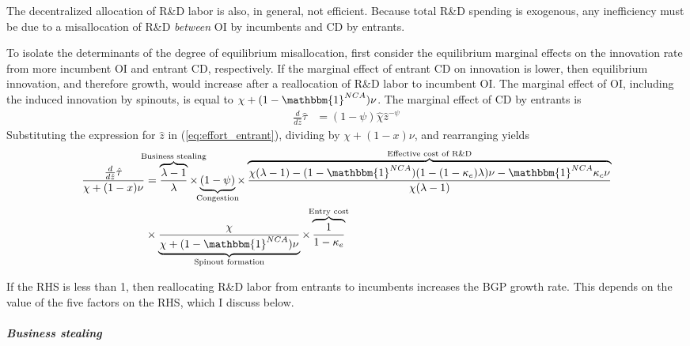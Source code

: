 \documentclass[11pt,english]{article}
\begin{document}
The decentralized allocation of R\&D labor is also, in general, not efficient. Because total R\&D spending is exogenous, any inefficiency must be due to a misallocation of R\&D \textit{between} OI by incumbents and CD by entrants.

To isolate the determinants of the degree of equilibrium misallocation, first consider the equilibrium marginal effects on the innovation rate from more incumbent OI and entrant CD, respectively. If the marginal effect of entrant CD on innovation is lower, then equilibrium innovation, and therefore growth, would increase after a reallocation of R\&D labor to incumbent OI. The marginal effect of OI, including the induced innovation by spinouts, is equal to $\chi + (1-\mathbbm{1}^{NCA}) \nu$. The marginal effect of CD by entrants is
\begin{align}
\frac{d}{d\hat{z}} \hat{\tau} &= (1-\psi) \hat{\chi} \hat{z}^{-\psi} \label{eq:marginal_effect_effort_entrant}
\end{align}
%
Substituting the expression for $\hat{z}$ in (\ref{eq:effort_entrant}), dividing by $\chi + (1-x)\nu$, and rearranging yields 
\begin{align}
	\frac{\frac{d}{d\hat{z}} \hat{\tau}}{\chi + (1-x)\nu} &= \overbrace{\frac{\lambda-1}{\lambda}}^{\mathclap{\text{Business stealing}}} \times \underbrace{(1-\psi)}_{\mathclap{\text{Congestion}}}  \times \overbrace{\frac{\chi(\lambda-1) -(1-\mathbbm{1}^{NCA}) (1-(1-\kappa_e)\lambda)\nu - \mathbbm{1}^{NCA} \kappa_c \nu}{\chi(\lambda-1)}}^{\mathclap{\text{Effective cost of R\&D}}} \nonumber \\
	&\times \underbrace{\frac{\chi}{\chi + (1-\mathbbm{1}^{NCA})\nu}}_{\mathclap{\text{Spinout formation}}} \times  \overbrace{\frac{1}{1-\kappa_{e}}}^{\mathclap{\text{Entry cost}}}  \label{cs:growth_misallocation_condition}
\end{align}

If the RHS is less than 1, then reallocating R\&D labor from entrants to incumbents increases the BGP growth rate. This depends on the value of the five factors on the RHS, which I discuss below. 

\subparagraph{Business stealing}
\end{document}
